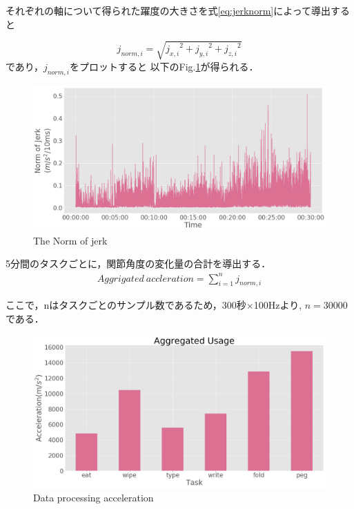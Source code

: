 それぞれの軸について得られた躍度の大きさを式\ref{eq:jerknorm}によって導出すると

\begin{equation}
j_{norm,i} = \sqrt{{j_{x,i}}^2+{j_{y,i}}^2+{j_{z,i}}^2}
\label{eq:jerknorm}
\end{equation}
であり，$j_{norm,i}$をプロットすると
以下のFig.\ref{fig:norm_jerk}が得られる．

\begin{figure}[H]
  \centering
  \includegraphics[width=0.8\linewidth]{fig/norm_jerk}
  \caption{The Norm of jerk}
  \label{fig:norm_jerk}
\end{figure}

5分間のタスクごとに，関節角度の変化量の合計を導出する．
\begin{eqnarray}
Aggrigated\ accleration  = \sum_{i=1}^n j_{norm,i}
\end{eqnarray}

ここで，nはタスクごとのサンプル数であるため，300秒$\times$100Hzより,
$n=30000$である．

\begin{figure}[H]
  \centering
  \includegraphics[width=0.8\linewidth]{fig/aggrigated_accel}
  \caption{Data processing acceleration}
  \label{fig:accel_xyz}
\end{figure}

